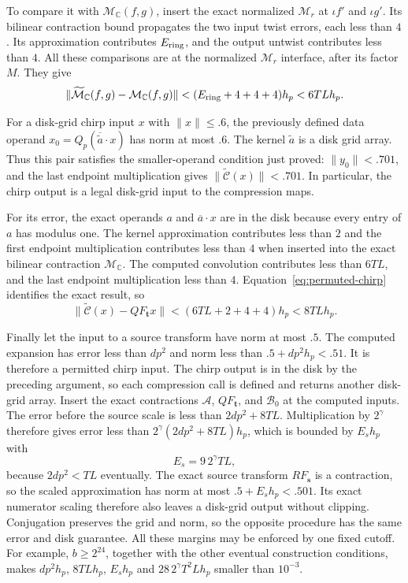 To compare it with $\mathcal M_{\mathbb C}(f,g)$, insert the exact
normalized $\mathcal M_r$ at $\iota f'$ and $\iota g'$.
Its bilinear contraction bound propagates the two input twist errors,
each less than $4$.  Its approximation contributes $E_{\rm ring}$,
and the output untwist contributes less than $4$.  All these
comparisons are at the normalized $\mathcal M_r$ interface, after its
factor $M$.  They give
\[
 \|\widetilde{\mathcal M}_{\mathbb C}(f,g)
            -\mathcal M_{\mathbb C}(f,g)\|
 <(E_{\rm ring}+4+4+4)h_p<6TLh_p.
\]

For a disk-grid chirp input $x$ with $\|x\|\le.6$, the previously
defined data operand $x_0=Q_p(\overline{\widetilde a}\cdot x)$ has
norm at most $.6$.  The kernel $\widetilde a$ is a disk grid array.
Thus this pair satisfies the smaller-operand condition just proved:
$\|y_0\|<.701$, and the last endpoint multiplication gives
$\|\widetilde{\mathscr C}(x)\|<.701$.  In particular, the chirp output
is a legal disk-grid input to the compression maps.

For its error, the exact operands $a$ and $\overline a\cdot x$ are in
the disk because every entry of $a$ has modulus one.  The kernel
approximation contributes less than $2$ and
the first endpoint multiplication contributes less than $4$ when
inserted into the exact bilinear contraction
$\mathcal M_{\mathbb C}$.  The computed convolution contributes less
than $6TL$, and the last endpoint multiplication less than $4$.
Equation~\eqref{eq:permuted-chirp} identifies the exact result, so
\[
 \|\widetilde{\mathscr C}(x)-QF_{\boldsymbol t}x\|
 <(6TL+2+4+4)h_p<8TLh_p.
\]

Finally let the input to a source transform have norm at most $.5$.
The computed expansion has error less than $dp^2$ and norm less than
$.5+dp^2h_p<.51$.  It is therefore a permitted chirp input.  The
chirp output is in the disk by the preceding argument, so each
compression call is defined and returns another disk-grid array.
Insert the exact contractions $\mathcal A$, $QF_{\boldsymbol t}$,
and $\mathcal B_0$ at the computed inputs.  The error before the
source scale is less than $2dp^2+8TL$.  Multiplication by
$2^\gamma$ therefore gives error less than
$2^\gamma(2dp^2+8TL)h_p$, which is bounded by $E_sh_p$ with
\begin{equation}\label{eq:source-error}
 E_s=9\,2^\gamma TL,
\end{equation}
because $2dp^2<TL$ eventually.  The exact source transform
$RF_{\boldsymbol s}$ is a contraction, so the scaled approximation
has norm at most $.5+E_sh_p<.501$.  Its exact numerator scaling
therefore also leaves a disk-grid output without clipping.
Conjugation preserves the grid and norm, so the opposite procedure
has the same error and disk guarantee.
All these margins may be enforced by one fixed cutoff.  For example,
$b\ge2^{24}$, together with the other eventual construction conditions,
makes $dp^2h_p$, $8TLh_p$, $E_sh_p$ and
$28\,2^\gamma T^2Lh_p$ smaller than $10^{-3}$.

